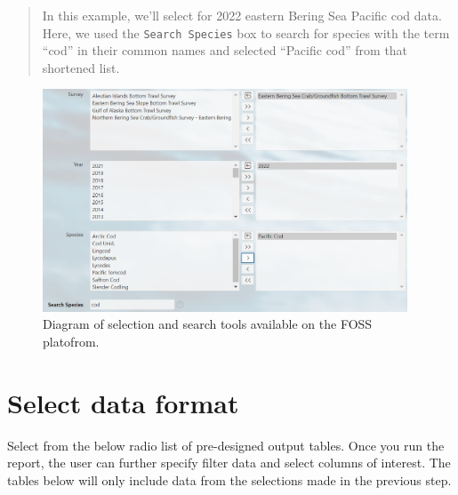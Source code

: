 \documentclass[
  letterpaper,
  oneside,
  open=any]{scrbook}
\begin{document}
\begin{quote}
In this example, we'll select for 2022 eastern Bering Sea Pacific cod
data. Here, we used the \texttt{Search\ Species} box to search for
species with the term ``cod'' in their common names and selected
``Pacific cod'' from that shortened list.
\end{quote}

\begin{figure}

{\centering \includegraphics[width=4.27in,height=\textheight]{content/../img/foss_3_selected.png}

}

\caption{Diagram of selection and search tools available on the FOSS
platofrom.}

\end{figure}

\hypertarget{select-data-format}{%
\section{Select data format}\label{select-data-format}}

Select from the below radio list of pre-designed output tables. Once you
run the report, the user can further specify filter data and select
columns of interest. The tables below will only include data from the
selections made in the previous step.
\end{document}
